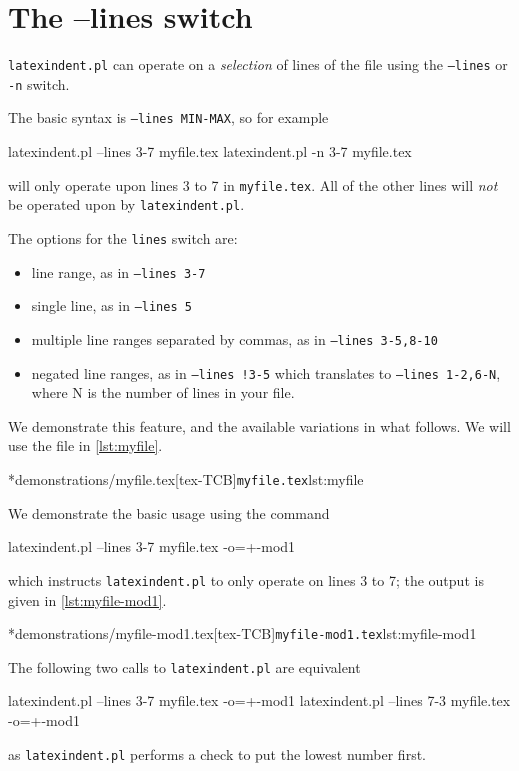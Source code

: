 \section{The --lines switch}\label{sec:line-switch}
 \texttt{latexindent.pl}
  can
 operate on a \emph{selection} of lines of the file using the \texttt{--lines} or
 \texttt{-n} switch.


 The basic syntax is \texttt{--lines MIN-MAX}, so for example
 \begin{commandshell}
latexindent.pl --lines 3-7 myfile.tex
latexindent.pl -n 3-7 myfile.tex
\end{commandshell}
 will only operate upon lines 3 to 7 in \texttt{myfile.tex}. All of the other lines will
 \emph{not} be operated upon by \texttt{latexindent.pl}.

 The options for the \texttt{lines} switch are:
 \begin{itemize}
	 \item line range, as in \texttt{--lines 3-7}
	 \item single line, as in \texttt{--lines 5}
	 \item multiple line ranges separated by commas, as in \texttt{--lines 3-5,8-10}
	 \item negated line ranges, as in \texttt{--lines !3-5} which translates to \texttt{--lines
		       1-2,6-N}, where N is the number of lines in your file.
 \end{itemize}

 We demonstrate this feature, and the available variations in what follows. We will use
 the file in \cref{lst:myfile}.

 \cmhlistingsfromfile*[style=lineNumbersTeX]*{demonstrations/myfile.tex}[tex-TCB]{\texttt{myfile.tex}}{lst:myfile}

 \begin{example}
	 We demonstrate the basic usage using the command
	 \begin{commandshell}
latexindent.pl --lines 3-7 myfile.tex -o=+-mod1
\end{commandshell}
	 which instructs \texttt{latexindent.pl} to only operate on lines 3 to 7; the output is given in \cref{lst:myfile-mod1}.

	 \cmhlistingsfromfile*[style=lineNumbersTeX]*{demonstrations/myfile-mod1.tex}[tex-TCB]{\texttt{myfile-mod1.tex}}{lst:myfile-mod1}

	 The following two calls to \texttt{latexindent.pl} are equivalent
	 \begin{commandshell}
latexindent.pl --lines 3-7 myfile.tex -o=+-mod1
latexindent.pl --lines 7-3 myfile.tex -o=+-mod1
\end{commandshell}
	 as \texttt{latexindent.pl} performs a check to put the lowest number first.
 \end{example}

